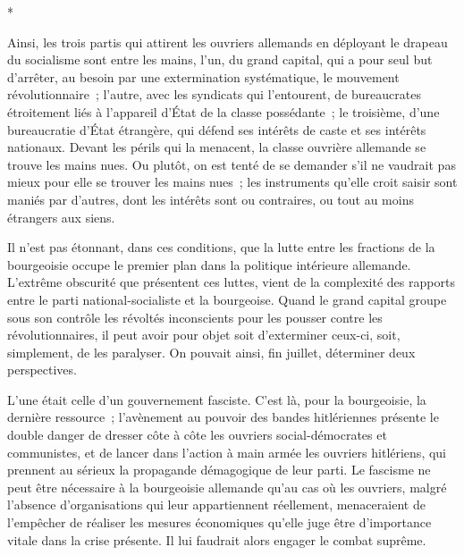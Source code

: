 \documentclass[french,twoside]{book} %
\begin{document}
\begin{center}
*\end{center}
\noindent Ainsi, les trois partis qui attirent les ouvriers allemands en déployant le drapeau du socialisme sont entre les mains, l'un, du grand capital, qui a pour seul but d'arrêter, au besoin par une extermination systématique, le mouve­ment révolutionnaire ; l'autre, avec les syndicats qui l'entourent, de bureau­crates étroitement liés à l'appareil d'État de la classe possédante ; le troisième, d'une bureaucratie d'État étrangère, qui défend ses intérêts de caste et ses intérêts nationaux. Devant les périls qui la menacent, la classe ouvrière allemande se trouve les mains nues. Ou plutôt, on est tenté de se demander s'il ne vaudrait pas mieux pour elle se trouver les mains nues ; les instruments qu'elle croit saisir sont maniés par d'autres, dont les intérêts sont ou contraires, ou tout au moins étrangers aux siens.\par
Il n'est pas étonnant, dans ces conditions, que la lutte entre les fractions de la bourgeoisie occupe le premier plan dans la politique intérieure allemande. L'extrême obscurité que présentent ces luttes, vient de la complexité des rapports entre le parti national-socialiste et la bourgeoise. Quand le grand capital groupe sous son contrôle les révoltés inconscients pour les pousser contre les révolutionnaires, il peut avoir pour objet soit d'exterminer ceux-ci, soit, simplement, de les paralyser. On pouvait ainsi, fin juillet, déterminer deux perspectives.\par
L'une était celle d'un gouvernement fasciste. C'est là, pour la bourgeoisie, la dernière ressource ; l'avènement au pouvoir des bandes hitlériennes présente le double danger de dresser côte à côte les ouvriers social-démocrates et communistes, et de lancer dans l'action à main armée les ouvriers hitlériens, qui prennent au sérieux la propagande démagogique de leur parti. Le fascisme ne peut être nécessaire à la bourgeoisie allemande qu'au cas où les ouvriers, malgré l'absence d'organisations qui leur appartiennent réellement, menace­raient de l'empêcher de réaliser les mesures économiques qu'elle juge être d'importance vitale dans la crise présente. Il lui faudrait alors engager le combat suprême.\par
\end{document}

